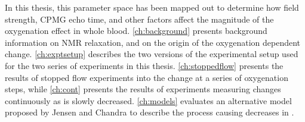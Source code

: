 In this thesis, this parameter space has been mapped out to determine how field strength, CPMG echo time, and other factors affect the magnitude of the oxygenation \Ttwo effect in whole blood.
\autoref{ch:background} presents background information on NMR relaxation, and on the origin of the oxygenation dependent \Ttwo change.
\autoref{ch:exptsetup} describes the two versions of the experimental setup used for the two series of experiments in this thesis.
\autoref{ch:stoppedflow} presents the results of stopped flow experiments into the \Ttwo change at a series of oxygenation steps, while \autoref{ch:cont} presents the results of experiments measuring \Ttwo changes continuously as \SOtwo is slowly decreased.
\autoref{ch:models} evaluates an alternative model proposed by Jensen and Chandra to describe the process causing decreases in \Ttwo\cite{JensenNMRrelaxationtissues2000}.
